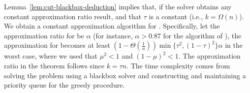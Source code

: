 Lemma~\ref{lem:cut-blackbox-deduction} implies that, if the \maxcut solver obtains any constant approximation ratio result, and that $\tau$ is a constant (i.e., $k = \Omega(n)$). We obtain a constant approximation algorithm for \maxcutkc. 
Specifically, let the approximation ratio for \maxcut be $\alpha$ (for instance,
$\alpha > 0.87$ for the algorithm of \citet{goemans1994approximation}),
the approximation for \maxcutkc becomes at least $(1 - \Theta(\frac{1}{n}))\min\{\tau^2, (1-\tau)^2\} \alpha$ in the worst
case, where we used that $\mu^2 < 1$ and $(1-\mu)^2 < 1$. The approximation
ratio in the theorem follows since $k = \tau n$.
The time complexity comes from solving the \maxcut problem using a blackbox solver and constructing and maintaining a priority queue for the greedy procedure.
